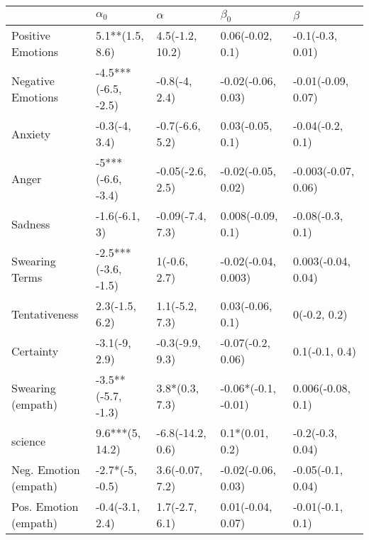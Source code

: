 \begin{tabular}{lllll}
\toprule
{} &           $\alpha_0$ &          $\alpha$ &            $\beta_0$ &              $\beta$ \\
\midrule
Positive Emotions     &      5.1**(1.5, 8.6) &   4.5(-1.2, 10.2) &     0.06(-0.02, 0.1) &     -0.1(-0.3, 0.01) \\
Negative Emotions     &  -4.5***(-6.5, -2.5) &     -0.8(-4, 2.4) &   -0.02(-0.06, 0.03) &   -0.01(-0.09, 0.07) \\
Anxiety               &        -0.3(-4, 3.4) &   -0.7(-6.6, 5.2) &     0.03(-0.05, 0.1) &     -0.04(-0.2, 0.1) \\
Anger                 &    -5***(-6.6, -3.4) &  -0.05(-2.6, 2.5) &   -0.02(-0.05, 0.02) &  -0.003(-0.07, 0.06) \\
Sadness               &        -1.6(-6.1, 3) &  -0.09(-7.4, 7.3) &    0.008(-0.09, 0.1) &     -0.08(-0.3, 0.1) \\
Swearing Terms        &  -2.5***(-3.6, -1.5) &      1(-0.6, 2.7) &  -0.02(-0.04, 0.003) &   0.003(-0.04, 0.04) \\
Tentativeness         &       2.3(-1.5, 6.2) &    1.1(-5.2, 7.3) &     0.03(-0.06, 0.1) &         0(-0.2, 0.2) \\
Certainty             &        -3.1(-9, 2.9) &   -0.3(-9.9, 9.3) &    -0.07(-0.2, 0.06) &       0.1(-0.1, 0.4) \\
Swearing (empath)     &   -3.5**(-5.7, -1.3) &    3.8*(0.3, 7.3) &  -0.06*(-0.1, -0.01) &    0.006(-0.08, 0.1) \\
science               &      9.6***(5, 14.2) &  -6.8(-14.2, 0.6) &      0.1*(0.01, 0.2) &     -0.2(-0.3, 0.04) \\
Neg. Emotion (empath) &      -2.7*(-5, -0.5) &   3.6(-0.07, 7.2) &   -0.02(-0.06, 0.03) &    -0.05(-0.1, 0.04) \\
Pos. Emotion (empath) &      -0.4(-3.1, 2.4) &    1.7(-2.7, 6.1) &    0.01(-0.04, 0.07) &     -0.01(-0.1, 0.1) \\
\bottomrule
\end{tabular}
